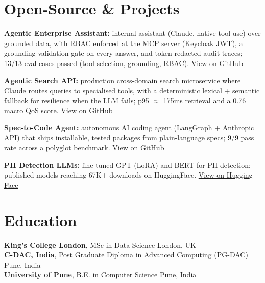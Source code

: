 \documentclass[10pt,a4paper]{article}
\begin{document}
\section{Open-Source \& Projects}
\begin{tight}
  \item \textbf{Agentic Enterprise Assistant:} internal assistant (Claude, native tool use) over grounded data, with RBAC enforced at the MCP server (Keycloak JWT), a grounding-validation gate on every answer, and token-redacted audit traces; 13/13 eval cases passed (tool selection, grounding, RBAC). \href{https://github.com/abhijeetscode/Agentic-Enterprise-Assistant}{View on GitHub}
  \item \textbf{Agentic Search API:} production cross-domain search microservice where Claude routes queries to specialised tools, with a deterministic lexical + semantic fallback for resilience when the LLM fails; p95 $\approx$ 175ms retrieval and a 0.76 macro QoS score. \href{https://github.com/abhijeetscode/search-agent}{View on GitHub}
  \item \textbf{Spec-to-Code Agent:} autonomous AI coding agent (LangGraph + Anthropic API) that ships installable, tested packages from plain-language specs; 9/9 pass rate across a polyglot benchmark. \href{https://github.com/abhijeetscode/Spec-to-Code-Agent}{View on GitHub}
  \item \textbf{PII Detection LLMs:} fine-tuned GPT (LoRA) and BERT for PII detection; published models reaching 67K+ downloads on HuggingFace. \href{https://huggingface.co/ab-ai/pii_model}{View on Hugging Face}
\end{tight}

\section{Education}
{\color{company}\bfseries King's College London}, MSc in Data Science \hfill {\color{muted}London, UK}\\
{\color{company}\bfseries C-DAC, India}, Post Graduate Diploma in Advanced Computing (PG-DAC) \hfill {\color{muted}Pune, India}\\
{\color{company}\bfseries University of Pune}, B.E. in Computer Science \hfill {\color{muted}Pune, India}
\end{document}
